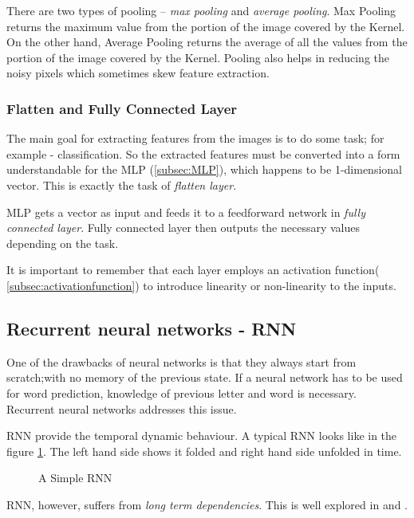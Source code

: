 There are two types of pooling -- \textit{max pooling} and \textit{average pooling}. Max Pooling
returns the maximum value from the portion of the image covered by the Kernel.
On the other hand, Average Pooling returns the average of all the values
from the portion of the image covered by the Kernel. Pooling also helps in reducing the
noisy pixels which sometimes skew feature extraction.

\subsubsection*{Flatten and Fully Connected Layer}
The main goal for extracting features from the images is to do some task; for example -
classification. So the extracted features must be converted into a form understandable for
the MLP (\ref{subsec:MLP}), which happens to be 1-dimensional vector. This is exactly the
task of \textit{flatten layer}.

MLP gets a vector as input and feeds it to a feedforward network in \textit{fully
connected layer}. Fully connected layer then outputs the necessary values depending on the
task.

It is important to remember that each layer employs an activation function(
\ref{subsec:activationfunction}) to introduce linearity or non-linearity to the inputs.

\subsection{Recurrent neural networks - RNN}
One of the drawbacks of neural networks is that they always start from scratch;with no
memory of the previous state. If a neural network has to be used for word prediction,
knowledge of previous letter and word is necessary. Recurrent neural networks addresses
this issue.

RNN provide the temporal dynamic behaviour. A typical RNN looks like in the figure
\ref{fig:RNN}. The left hand side shows it folded and right hand side unfolded in time.
\begin{figure}[h]
	\centering
        \def\svgwidth{0.7\textwidth}
\begin{tiny}
        
\end{tiny}
    \caption{A Simple RNN}
    \label{fig:RNN}
\end{figure}
RNN, however, suffers from \textit{long term dependencies}. This is well explored in
\cite{RNNdrawback1} and \cite{RNNdrawback2}.

